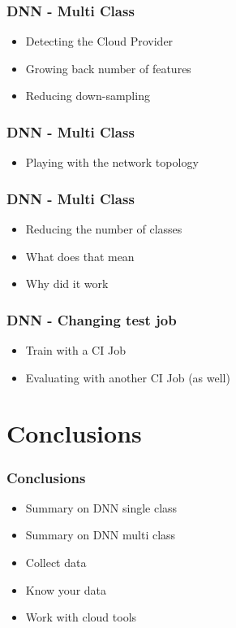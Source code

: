 \documentclass[aspectratio=169,11pt,hyperref={colorlinks=true}]{beamer}
\begin{document}
\begin{frame}
    \frametitle{DNN - Multi Class}
    \begin{itemize}
        \item{Detecting the Cloud Provider}
        \item{Growing back number of features}
        \item{Reducing down-sampling}
    \end{itemize}
\end{frame}

\begin{frame}
    \frametitle{DNN - Multi Class}
    \begin{itemize}
        \item{Playing with the network topology}
    \end{itemize}
\end{frame}

\begin{frame}
    \frametitle{DNN - Multi Class}
    \begin{itemize}
        \item{Reducing the number of classes}
        \item{What does that mean}
        \item{Why did it work}
    \end{itemize}
\end{frame}

\begin{frame}
    \frametitle{DNN - Changing test job}
    \begin{itemize}
        \item{Train with a CI Job}
        \item{Evaluating with another CI Job (as well)}
    \end{itemize}
\end{frame}

\section{Conclusions}
\begin{frame}
  \frametitle{Conclusions}
  \begin{itemize}
      \item{Summary on DNN single class}
      \item{Summary on DNN multi class}
      \item{Collect data}
      \item{Know your data}
      \item{Work with cloud tools}
  \end{itemize}
\end{frame}
\end{document}
